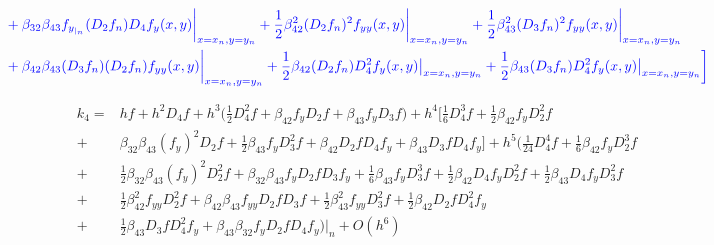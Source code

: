 \documentclass[12 pt]{article}
\begin{document}
\begin{equation}
\begin{split}
			&\color{blue}+ \beta_{32}\beta_{43}f_{y_{|_{n}}}(D_{2}f_{n})D_{4}f_{y}(x,y)\bigg\vert_{x=x_{n}, y= y_{n}} + \frac{1}{2}\beta_{42}^{2}(D_{2}f_{n})^{2}f_{yy}(x,y)\bigg\vert_{x=x_{n}, y= y_{n}} + \frac{1}{2}\beta_{43}^{2}(D_{3}f_{n})^{2}f_{yy}(x,y)\bigg\vert_{x=x_{n}, y= y_{n}} \\
			&\color{blue}+ \beta_{42}\beta_{43}(D_{3}f_{n})(D_{2}f_{n})f_{yy}(x,y)\bigg\vert_{x=x_{n}, y= y_{n}} + \frac{1}{2}\beta_{42}(D_{2}f_{n})D_{4}^{2}f_{y}(x,y)\big\vert_{x = x_{n}, y= y_{n}} + \frac{1}{2}\beta_{43}(D_{3}f_{n})D_{4}^{2}f_{y}(x,y)\big\vert_{x = x_{n}, y= y_{n}}\bigg]
		\end{split}
	\end{equation}
	
	
	
	\large
	\begin{align*}
		k_{4} =& hf + h^{2}D_{4}f + h^{3}\bigg(\frac{1}{2}D_{4}^{2}f + \beta_{42}f_{y}D_{2}f + \beta_{43}f_{y}D_{3}f\bigg) + h^{4}\bigg[\frac{1}{6}D^{3}_{4}f + \frac{1}{2}\beta_{42}f_{y}D_{2}^{2}f\\
		+& \beta_{32}\beta_{43}(f_{y})^{2}D_{2}f + \frac{1}{2}\beta_{43}f_{y}D_{3}^{2}f + \beta_{42}D_{2}fD_{4}f_{y}	+ \beta_{43}D_{3}fD_{4}f_{y}\bigg] +  h^{5}\bigg(\frac{1}{24}D_{4}^{4}f + \frac{1}{6}\beta_{42}f_{y}D_{2}^{3}f\\
		+&\frac{1}{2}\beta_{32}\beta_{43}(f_{y})^{2}D_{2}^{2}f + \beta_{32}\beta_{43}f_{y}D_{2}fD_{3}f_{y} + \frac{1}{6}\beta_{43}f_{y}D_{3}^{3}f + \frac{1}{2}\beta_{42}D_{4}f_{y}D_{2}^{2}f + \frac{1}{2}\beta_{43}D_{4}f_{y}D_{3}^{2}f\\
		+&\frac{1}{2}\beta_{42}^{2}f_{yy}D_{2}^{2}f + \beta_{42}\beta_{43}f_{yy}D_{2}fD_{3}f + \frac{1}{2}\beta_{43}^{2}f_{yy}D_{3}^{2}f + \frac{1}{2}\beta_{42}D_{2}fD_{4}^{2}f_{y}\\
		+& \frac{1}{2}\beta_{43}D_{3}fD_{4}^{2}f_{y} + \beta_{43}\beta_{32}f_{y}D_{2}fD_{4}f_{y}\bigg)\bigg\vert_{n} + O(h^{6})
	\end{align*}
	
\end{document}
